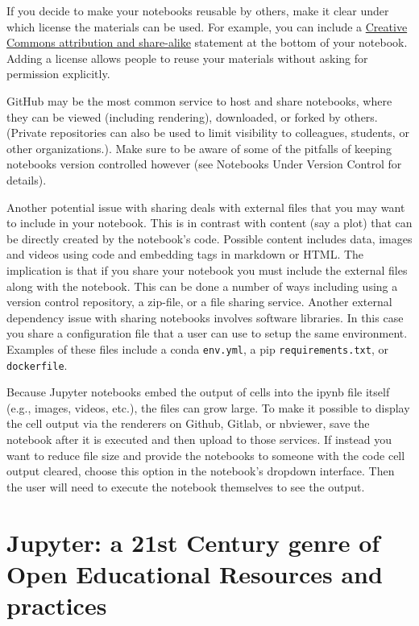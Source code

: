 \documentclass[]{book}
\begin{document}
If you decide to make your notebooks reusable by others, make it clear
under which license the materials can be used. For example, you can
include a
\href{https://creativecommons.org/licenses/by-sa/3.0/us/}{Creative
Commons attribution and share-alike} statement at the bottom of your
notebook. Adding a license allows people to reuse your materials without
asking for permission explicitly.

GitHub may be the most common service to host and share notebooks, where
they can be viewed (including rendering), downloaded, or forked by
others. (Private repositories can also be used to limit visibility to
colleagues, students, or other organizations.). Make sure to be aware of
some of the pitfalls of keeping notebooks version controlled however
(see Notebooks Under Version Control for details).

Another potential issue with sharing deals with external files that you
may want to include in your notebook. This is in contrast with content
(say a plot) that can be directly created by the notebook's code.
Possible content includes data, images and videos using code and
embedding tags in markdown or HTML. The implication is that if you share
your notebook you must include the external files along with the
notebook. This can be done a number of ways including using a version
control repository, a zip-file, or a file sharing service. Another
external dependency issue with sharing notebooks involves software
libraries. In this case you share a configuration file that a user can
use to setup the same environment. Examples of these files include a
conda \texttt{env.yml}, a pip \texttt{requirements.txt}, or
\texttt{dockerfile}.

Because Jupyter notebooks embed the output of cells into the ipynb file
itself (e.g., images, videos, etc.), the files can grow large. To make
it possible to display the cell output via the renderers on Github,
Gitlab, or nbviewer, save the notebook after it is executed and then
upload to those services. If instead you want to reduce file size and
provide the notebooks to someone with the code cell output cleared,
choose this option in the notebook's dropdown interface. Then the user
will need to execute the notebook themselves to see the output.

\section{Jupyter: a 21st Century genre of Open Educational Resources and
practices}\label{jupyter-a-21st-century-genre-of-open-educational-resources-and-practices}
\end{document}
